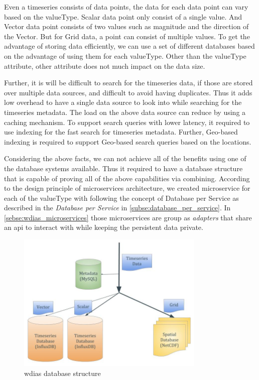 Even a timeseries consists of data points, the data for each data point can vary based on the valueType. Scalar data point only consist of a single value. And Vector data point consists of two values such as magnitude and the direction of the Vector. But for Grid data, a point can consist of multiple values. To get the advantage of storing data efficiently, we can use a set of different databases based on the advantage of using them for each valueType. Other than the valueType attribute, other attribute does not much impact on the data size.

Further, it is will be difficult to search for the timeseries data, if those are stored over multiple data sources, and difficult to avoid having duplicates. Thus it adds low overhead to have a single data source to look into while searching for the timeseries metadata. The load on the above data source can reduce by using a caching mechanism. To support search queries with lower latency, it required to use indexing for the fast search for timeseries metadata. Further, Geo-based indexing is required to support Geo-based search queries based on the locations. 

Considering the above facts, we can not achieve all of the benefits using one of the database systems available. Thus it required to have a database structure that is capable of proving all of the above capabilities via combining. According to the design principle of microservices architecture, we created microservice for each of the valueType with following the concept of Database per Service as described in the \emph{Database per Service} in \cref{subse:database_per_service}. In \cref{sebse:wdias_microservices} those microservices are group as \emph{adapters} that share an \acrshort{api} to interact with while keeping the persistent data private.

\begin{figure}[htp]
    \centering
    \includegraphics[width=0.8\textwidth]{method/microservice/wdias_database_structure.jpg}
    \caption{\acrshort{wdias} database structure}
    \label{fi:database_structure}
\end{figure}

